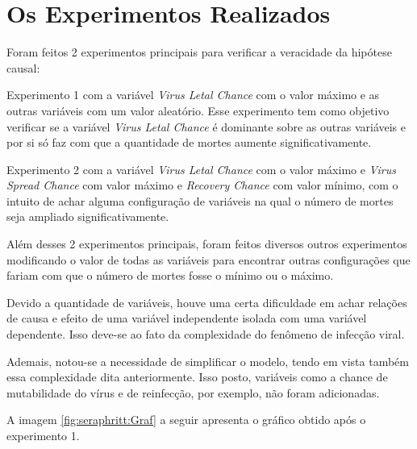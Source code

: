 % 



\section{Os Experimentos Realizados}

Foram feitos 2 experimentos principais para verificar a veracidade da hipótese causal:
\begin{description}
\item Experimento 1 com a variável \textit{Virus Letal Chance} com o valor máximo e as outras variáveis com um valor aleatório. Esse experimento tem como objetivo verificar se a variável \textit{Virus Letal Chance} é dominante sobre as outras variáveis e por si só faz com que a quantidade de mortes aumente significativamente.
\item Experimento 2 com a variável \textit{Virus Letal Chance} com o valor máximo e \textit{Virus Spread Chance} com valor máximo e \textit{Recovery Chance} com valor mínimo, com o intuito de achar alguma configuração de variáveis na qual o número de mortes seja ampliado significativamente. 
\end{description}
Além desses 2 experimentos principais, foram feitos diversos outros experimentos modificando o valor de todas as variáveis para encontrar outras configurações que fariam com que o número de mortes fosse o mínimo ou o máximo.

Devido a quantidade de variáveis, houve uma certa dificuldade em achar relações de causa e efeito de uma variável independente isolada com uma variável dependente. Isso deve-se ao fato da complexidade do fenômeno de infecção viral.

Ademais, notou-se a necessidade de simplificar o modelo, tendo em vista também essa complexidade dita anteriormente. Isso posto, variáveis como a chance de mutabilidade do vírus e de reinfecção, por exemplo, não foram adicionadas. 

A imagem \ref{fig:seraphritt:Graf} a seguir apresenta o gráfico obtido após o experimento 1.

